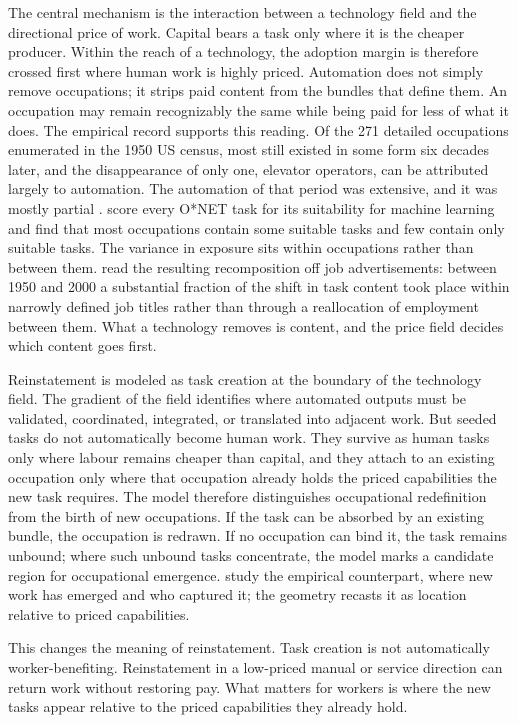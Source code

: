 \documentclass[12pt, a4paper]{article}
\begin{document}
The central mechanism is the interaction between a technology field and
the directional price of work. Capital bears a task only where it is the
cheaper producer. Within the reach of a technology, the adoption margin
is therefore crossed first where human work is highly priced. 
Automation does not simply remove occupations; it strips paid content from the bundles that define them. 
An occupation may remain recognizably the same while being paid for less of what it does. 
The empirical record supports this reading.
Of the 271 detailed occupations enumerated in the 1950 US census, most
still existed in some form six decades later, and the disappearance of
only one, elevator operators, can be attributed largely to automation.
The automation of that period was extensive, and it was mostly partial
\parencite{bessen2019demand}.
\textcite{brynjolfsson2018mlworkforce} score every O*NET task for its
suitability for machine learning and find that most occupations contain
some suitable tasks and few contain only suitable tasks. The variance in
exposure sits within occupations rather than between them.
\textcite{atalay2020evolution} read the resulting recomposition off job
advertisements: between 1950 and 2000 a substantial fraction of the
shift in task content took place within narrowly defined job titles
rather than through a reallocation of employment between them. What a
technology removes is content, and the price field decides which content
goes first.

Reinstatement is modeled as task creation at the boundary of the
technology field. The gradient of the field identifies where automated
outputs must be validated, coordinated, integrated, or translated into
adjacent work. But seeded tasks do not automatically become human work.
They survive as human tasks only where labour remains cheaper than
capital, and they attach to an existing occupation only where that
occupation already holds the priced capabilities the new task requires.
The model therefore distinguishes occupational redefinition from the
birth of new occupations. If the task can be absorbed by an existing
bundle, the occupation is redrawn. If no occupation can bind it, the task
remains unbound; where such unbound tasks concentrate, the model marks a
candidate region for occupational emergence.
\textcite{autor2024newwork} study the empirical counterpart, where new
work has emerged and who captured it; the geometry recasts it as
location relative to priced capabilities.

This changes the meaning of reinstatement. Task creation is not
automatically worker-benefiting. Reinstatement in a low-priced manual
or service direction can return work without restoring pay. What
matters for workers is where the new tasks appear relative to the
priced capabilities they already hold.
\end{document}
